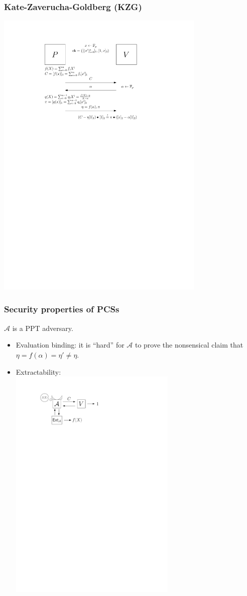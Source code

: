\documentclass[9pt]{beamer}
\newcommand{\A}{\mathcal A}  %
\begin{document}
\begin{frame}
\frametitle{Kate-Zaverucha-Goldberg (KZG)}
    \includegraphics[width=10cm]{kzg.pdf}
\end{frame}


\begin{frame}
\frametitle{Security properties of PCSs}
$ \A $ is a PPT adversary.

\begin{itemize}
    \item Evaluation binding: it is ``hard'' for $ \A $ to prove the nonsensical claim that $ \eta = f(\alpha) = \eta' \neq \eta $.
    \item Extractability:\\
    \includegraphics[width=8cm]{extractability.pdf}
\end{itemize}
\end{frame}
\end{document}
